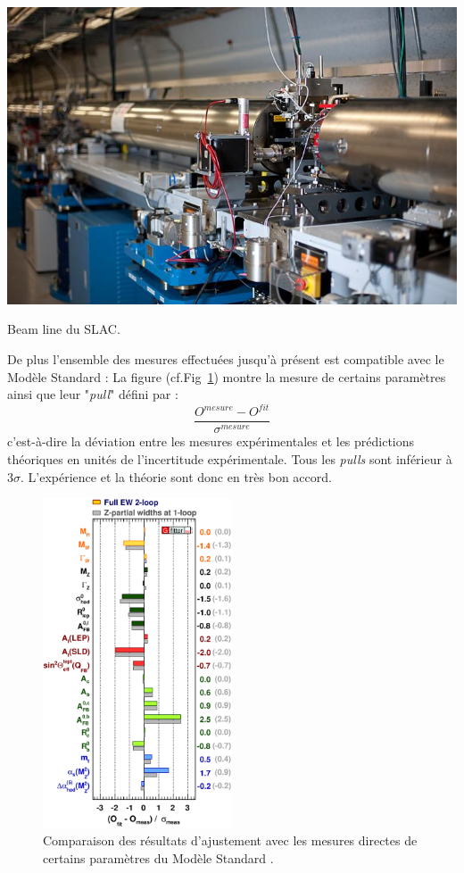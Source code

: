 \marginpar
{
	\centering
	\includegraphics[width=\marginparwidth]{SM/slac.jpg}
	\captionsetup{type=figure}\caption{Beam line du SLAC.}
	\label{SLAC}
}

De plus l'ensemble des mesures effectuées jusqu'à présent est compatible avec le Modèle Standard : La figure (cf.Fig~\ref{mesures}) montre la mesure de certains paramètres ainsi que leur "\textit{pull}" défini par :
\begin{equation}
\frac{O^{mesure}-O^{fit}}{\sigma^{mesure}}
\end{equation}
c'est-à-dire la déviation entre les mesures expérimentales et les prédictions théoriques en unités de l'incertitude expérimentale. Tous les \textit{pulls} sont inférieur à \num{3}$\sigma$. L'expérience et la théorie sont donc en très bon accord.

\begin{figure}[ht!]
\centering
\includegraphics[width=0.50\textwidth]{SM/mesure.eps}
\captionsetup{type=figure}\caption{Comparaison des résultats d'ajustement avec les mesures directes de certains paramètres du Modèle Standard \cite{Baak:2014ora}.}
\label{mesures}
\end{figure}

